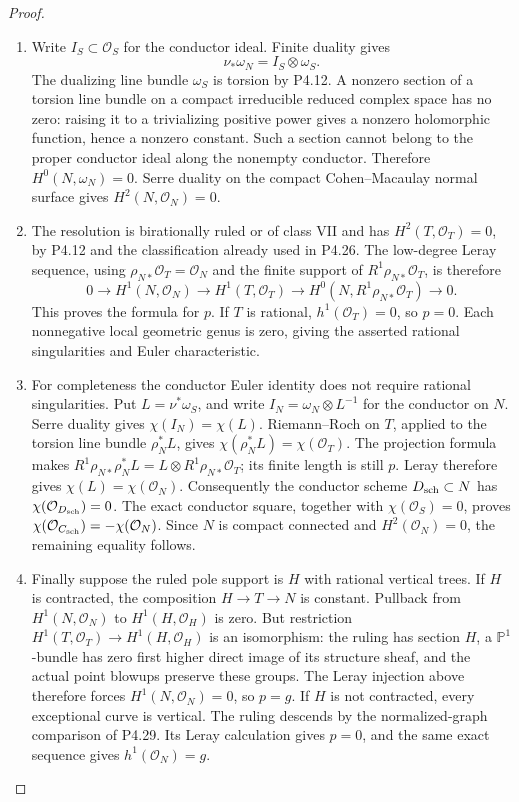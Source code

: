 \begin{proof}

\begin{enumerate}[label={$\langle1\rangle$\arabic*.},leftmargin=*]
\item Write $I_S\subset\mathcal O_S$ for the conductor ideal.
Finite duality gives
\[
 \nu_*\omega_N=I_S\otimes\omega_S.
\]
The dualizing line bundle $\omega_S$ is torsion by P4.12.
A nonzero section of a torsion line bundle on a compact
irreducible reduced complex space has no zero: raising it
to a trivializing positive power gives a nonzero holomorphic
function, hence a nonzero constant. Such a section cannot
belong to the proper conductor ideal along the nonempty
conductor. Therefore $H^0(N,\omega_N)=0$. Serre duality
on the compact Cohen--Macaulay normal surface gives
$H^2(N,\mathcal O_N)=0$.

\item The resolution is birationally ruled or of class VII and
has $H^2(T,\mathcal O_T)=0$, by P4.12 and the classification
already used in P4.26. The low-degree Leray sequence,
using $\rho_{N*}\mathcal O_T=\mathcal O_N$ and the
finite support of $R^1\rho_{N*}\mathcal O_T$, is therefore
\[
 0\longrightarrow H^1(N,\mathcal O_N)
 \longrightarrow H^1(T,\mathcal O_T)
 \longrightarrow H^0(N,R^1\rho_{N*}\mathcal O_T)
 \longrightarrow0.
\]
This proves the formula for $p$. If $T$ is rational,
$h^1(\mathcal O_T)=0$, so $p=0$. Each nonnegative local
geometric genus is zero, giving the asserted rational
singularities and Euler characteristic.

\item For completeness the conductor Euler identity does not
require rational singularities. Put $L=\nu^*\omega_S$,
and write $I_N=\omega_N\otimes L^{-1}$ for the conductor
on $N$. Serre duality gives $\chi(I_N)=\chi(L)$.
Riemann--Roch on $T$, applied to the torsion line bundle
$\rho_N^*L$, gives
$\chi(\rho_N^*L)=\chi(\mathcal O_T)$.
The projection formula makes
$R^1\rho_{N*}\rho_N^*L=L\otimes R^1\rho_{N*}\mathcal O_T$;
its finite length is still $p$. Leray therefore gives
$\chi(L)=\chi(\mathcal O_N)$.
Consequently the conductor scheme $D_{\rm sch}\subset N$
has $\chi(\mathcal O_{D_{\rm sch}})=0$.
The exact conductor square, together with
$\chi(\mathcal O_S)=0$, proves
$\chi(\mathcal O_{C_{\rm sch}})=-\chi(\mathcal O_N)$.
Since $N$ is compact connected and $H^2(\mathcal O_N)=0$,
the remaining equality follows.

\item Finally suppose the ruled pole support is $H$ with
rational vertical trees. If $H$ is contracted, the
composition $H\to T\to N$ is constant. Pullback from
$H^1(N,\mathcal O_N)$ to $H^1(H,\mathcal O_H)$ is zero.
But restriction
$H^1(T,\mathcal O_T)\to H^1(H,\mathcal O_H)$ is an
isomorphism: the ruling has section $H$, a
$\mathbb P^1$-bundle has zero first higher direct image
of its structure sheaf, and the actual point blowups
preserve these groups. The Leray injection above
therefore forces $H^1(N,\mathcal O_N)=0$, so $p=g$.
If $H$ is not contracted, every exceptional curve is
vertical. The ruling descends by the normalized-graph
comparison of P4.29. Its Leray calculation gives $p=0$,
and the same exact sequence gives $h^1(\mathcal O_N)=g$.


\end{enumerate}
\end{proof}
